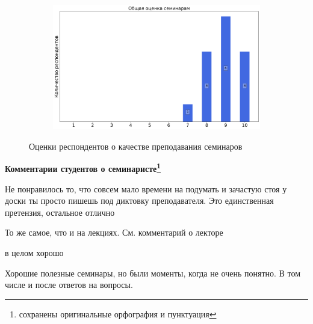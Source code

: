 \begin{figure}[H]
\begin{subfigure}[b]{0.45\textwidth}
			\end{subfigure}
			\begin{subfigure}[b]{0.45\textwidth}
				\centering
				\includegraphics[width=\textwidth]{images/1 course/Математический анализ/seminarists-marks-Знаменская Л.Н.-3.png}
			\end{subfigure}	
			\caption{Оценки респондентов о качестве преподавания семинаров}
		\end{figure}

		\textbf{Комментарии студентов о семинаристе\protect\footnote{сохранены оригинальные орфография и пунктуация}}
			\begin{commentbox} 
				Не понравилось то, что совсем мало времени на подумать и зачастую стоя у доски ты просто пишешь под диктовку преподавателя. Это единственная претензия, остальное отлично 
			\end{commentbox} 
		
			\begin{commentbox} 
				То же самое, что и на лекциях. См. комментарий о лекторе 
			\end{commentbox} 
		
			\begin{commentbox} 
				в целом хорошо 
			\end{commentbox} 
		
			\begin{commentbox} 
				Хорошие полезные семинары, но были моменты, когда не очень понятно. В том числе и после ответов на вопросы. 
			\end{commentbox} 

					
